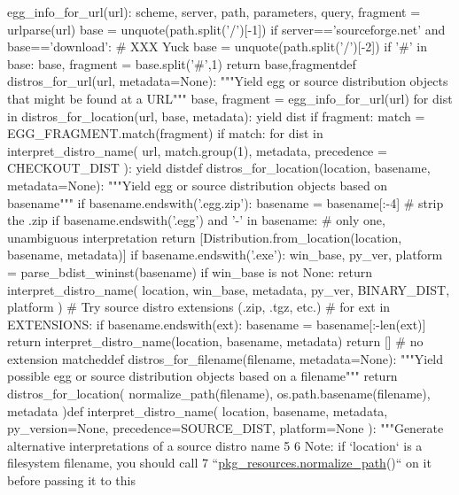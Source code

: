 \begin{DoxyCode}
       egg\_info\_for\_url(url):    scheme, server, path, parameters, query, fragment = urlparse(url)    base = 
      unquote(path.split(\textcolor{stringliteral}{'/'})[-1])    \textcolor{keywordflow}{if} server==\textcolor{stringliteral}{'sourceforge.net'} \textcolor{keywordflow}{and} base==\textcolor{stringliteral}{'download'}:    \textcolor{comment}{# XXX Yuck        base =
       unquote(path.split('/')[-2])    if '#' in base: base, fragment = base.split('#',1)    return base,fragmentdef
       distros\_for\_url(url, metadata=None):    """Yield egg or source distribution objects that might be found at a
       URL"""    base, fragment = egg\_info\_for\_url(url)    for dist in distros\_for\_location(url, base, metadata):
       yield dist    if fragment:        match = EGG\_FRAGMENT.match(fragment)        if match:            for dist
       in interpret\_distro\_name(                url, match.group(1), metadata, precedence = CHECKOUT\_DIST          
        ):                yield distdef distros\_for\_location(location, basename, metadata=None):    """Yield egg
       or source distribution objects based on basename"""    if basename.endswith('.egg.zip'):        basename =
       basename[:-4]    # strip the .zip    if basename.endswith('.egg') and '-' in basename:        # only one,
       unambiguous interpretation        return [Distribution.from\_location(location, basename, metadata)]    if
       basename.endswith('.exe'):        win\_base, py\_ver, platform = parse\_bdist\_wininst(basename)        if win\_base is
       not None:            return interpret\_distro\_name(                location, win\_base, metadata, py\_ver,
       BINARY\_DIST, platform            )    # Try source distro extensions (.zip, .tgz, etc.)    #    for ext in
       EXTENSIONS:        if basename.endswith(ext):            basename = basename[:-len(ext)]            return
       interpret\_distro\_name(location, basename, metadata)    return []  # no extension matcheddef
       distros\_for\_filename(filename, metadata=None):    """Yield possible egg or source distribution objects based on a filename"""   
       return distros\_for\_location(        normalize\_path(filename), os.path.basename(filename), metadata    )def
       interpret\_distro\_name(        location, basename, metadata, py\_version=None, precedence=SOURCE\_DIST,       
       platform=None        ):    """Generate alternative interpretations of a source distro name}
5 
6     Note: \textcolor{keywordflow}{if} `location` \textcolor{keywordflow}{is} a filesystem filename, you should call
7     ``\hyperlink{namespacepkg__resources_addc9d89b8b9ce3c9edcf2a55805bfe95}{pkg\_resources.normalize\_path}()`` on it before passing it to this

\end{DoxyCode}
